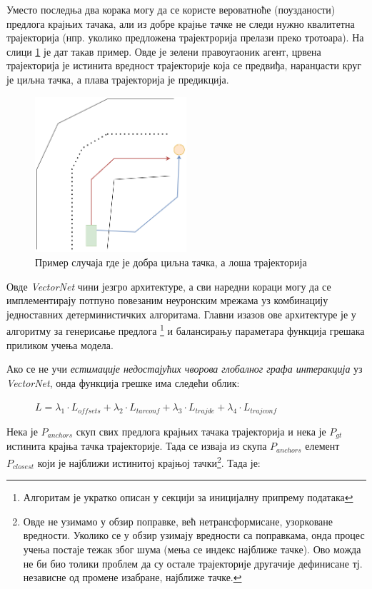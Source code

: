 \documentclass[11pt,oneside]{memoir}
\begin{document}
Уместо последња два корака могу да се користе вероватноће (поузданости) предлога крајњих тачака, али из добре крајње тачке не следи
нужно квалитетна трајекторија (нпр. уколико предложена трајектрорија прелази преко тротоара). На слици \ref{tnt-good-target-bad-traj}
је дат такав пример. Овде је зелени правоугаоник агент, црвена трајекторија је истинита вредност трајекторије која се предвиђа, 
наранџасти круг је циљна тачка, а плава трајекторија је предикција. 

\begin{figure}[H]
  \centering
  \includegraphics[width=0.5\textwidth]{images/tnt-good-end-point-and-bad-traj.drawio.png}
  \caption{Пример случаја где је добра циљна тачка, а лоша трајекторија \label{tnt-good-target-bad-traj}}
\end{figure}

Овде \textit{VectorNet} чини језгро архитектуре, а сви наредни кораци могу да се имплементирају потпуно повезаним неуронским мрежама уз комбинацију
једноставних детерминистичких алгоритама. Главни изазов ове архитектуре је у алгоритму за генерисање предлога
\footnote{Алгоритам је укратко описан у секцији за иницијалну припрему података} и балансирању
параметара функција грешака приликом учења модела.

\noindent Ако се не учи \textit{естимације недостајућих чворова глобалног графа интеракција} уз \textit{VectorNet}, 
онда функција грешке има следећи облик:

\begin{figure}[H]
  \centering
  $L = \lambda_{1} \cdot L_{offsets} + \lambda_{2} \cdot L_{tarconf} + \lambda_{3} \cdot L_{trajde} + \lambda_{4} \cdot L_{trajconf}$
\end{figure}

Нека је $P_{anchors}$ скуп свих предлога крајњих тачака трајекторија и нека је $P_{gt}$ истинита крајња тачка трајекторије. Тада се изваја
из скупа $P_{anchors}$ елемент $P_{closest}$ који је најближи истинитој крајњој тачки\footnote{Овде не узимамо у обзир поправке, 
већ нетрансформисане, узорковане вредности. 
Уколико се у обзир узимају вредности са поправкама, онда процес учења постаје тежак због шума (мења се индекс најближе тачке). Ово можда не би био
толики проблем да су остале трајекторије другачије дефинисане тј. независне од промене изабране, најближе тачке.}. 
Тада је:
\end{document}
